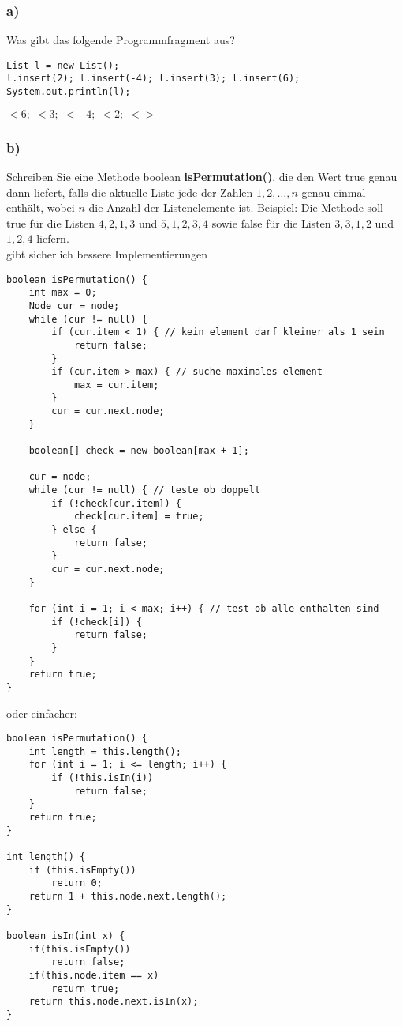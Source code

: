 \documentclass[a4paper, 10pt]{article}
\begin{document}
\subsubsection*{a)}
Was gibt das folgende Programmfragment aus?

\begin{lstlisting}
List l = new List();
l.insert(2); l.insert(-4); l.insert(3); l.insert(6);
System.out.println(l);
\end{lstlisting}

$<6;\;<3;\;<-4;\;<2;\;<>$

\subsubsection*{b)}
Schreiben Sie eine Methode boolean \textbf{isPermutation()}, die den Wert true genau
dann liefert, falls die aktuelle Liste jede der Zahlen $1, 2, \ldots, n$ genau einmal enthält,
wobei $n$ die Anzahl der Listenelemente ist. Beispiel: Die Methode soll true für die
Listen $4, 2, 1, 3$ und $5, 1, 2, 3, 4$ sowie false für die Listen $3, 3, 1, 2$ und $1, 2, 4$ liefern.\\

gibt sicherlich bessere Implementierungen

\begin{lstlisting}
boolean isPermutation() {
    int max = 0;
    Node cur = node;
    while (cur != null) { 
        if (cur.item < 1) { // kein element darf kleiner als 1 sein
            return false;
        }
        if (cur.item > max) { // suche maximales element
            max = cur.item;
        }
        cur = cur.next.node;
    }
    
    boolean[] check = new boolean[max + 1];
    
    cur = node;
    while (cur != null) { // teste ob doppelt
        if (!check[cur.item]) {
            check[cur.item] = true;
        } else {
            return false;
        }
        cur = cur.next.node;
    }
    
    for (int i = 1; i < max; i++) { // test ob alle enthalten sind
        if (!check[i]) {
            return false;
        }
    }
    return true;
}
\end{lstlisting}

oder einfacher:

\begin{lstlisting}
boolean isPermutation() {
	int length = this.length();
	for (int i = 1; i <= length; i++) {
		if (!this.isIn(i))
			return false;
	}
	return true;
}

int length() {
	if (this.isEmpty())
		return 0;
	return 1 + this.node.next.length();
}

boolean isIn(int x) {
	if(this.isEmpty())
		return false;
	if(this.node.item == x)
		return true;
	return this.node.next.isIn(x);
}
\end{lstlisting}
\end{document}
